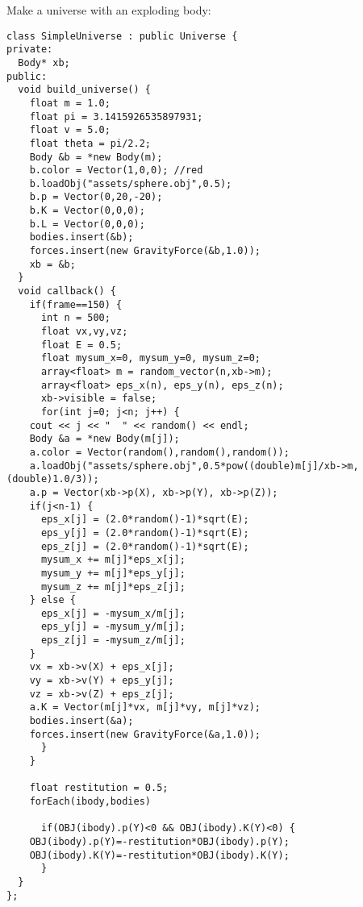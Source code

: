 \noindent
Make a universe with an exploding body: \begin{lstlisting}
class SimpleUniverse : public Universe {
private:
  Body* xb;
public:  
  void build_universe() {
    float m = 1.0;
    float pi = 3.1415926535897931;
    float v = 5.0;
    float theta = pi/2.2;
    Body &b = *new Body(m);
    b.color = Vector(1,0,0); //red
    b.loadObj("assets/sphere.obj",0.5);
    b.p = Vector(0,20,-20);
    b.K = Vector(0,0,0);
    b.L = Vector(0,0,0);
    bodies.insert(&b);
    forces.insert(new GravityForce(&b,1.0));
    xb = &b;
  }
  void callback() {
    if(frame==150) {
      int n = 500;
      float vx,vy,vz;
      float E = 0.5;
      float mysum_x=0, mysum_y=0, mysum_z=0;
      array<float> m = random_vector(n,xb->m);
      array<float> eps_x(n), eps_y(n), eps_z(n);
      xb->visible = false;
      for(int j=0; j<n; j++) {
	cout << j << "  " << random() << endl;
	Body &a = *new Body(m[j]);
	a.color = Vector(random(),random(),random());
	a.loadObj("assets/sphere.obj",0.5*pow((double)m[j]/xb->m,(double)1.0/3));
	a.p = Vector(xb->p(X), xb->p(Y), xb->p(Z));
	if(j<n-1) {
	  eps_x[j] = (2.0*random()-1)*sqrt(E);
	  eps_y[j] = (2.0*random()-1)*sqrt(E);
	  eps_z[j] = (2.0*random()-1)*sqrt(E);
	  mysum_x += m[j]*eps_x[j];
	  mysum_y += m[j]*eps_y[j];
	  mysum_z += m[j]*eps_z[j];
	} else {
	  eps_x[j] = -mysum_x/m[j];
	  eps_y[j] = -mysum_y/m[j];
	  eps_z[j] = -mysum_z/m[j];
	}
	vx = xb->v(X) + eps_x[j];
	vy = xb->v(Y) + eps_y[j];
	vz = xb->v(Z) + eps_z[j];
	a.K = Vector(m[j]*vx, m[j]*vy, m[j]*vz);
	bodies.insert(&a);
	forces.insert(new GravityForce(&a,1.0));
      }
    }
    
    float restitution = 0.5;
    forEach(ibody,bodies)
      
      if(OBJ(ibody).p(Y)<0 && OBJ(ibody).K(Y)<0) {
	OBJ(ibody).p(Y)=-restitution*OBJ(ibody).p(Y);
	OBJ(ibody).K(Y)=-restitution*OBJ(ibody).K(Y);
      }
  }
};
\end{lstlisting}
\noindent
